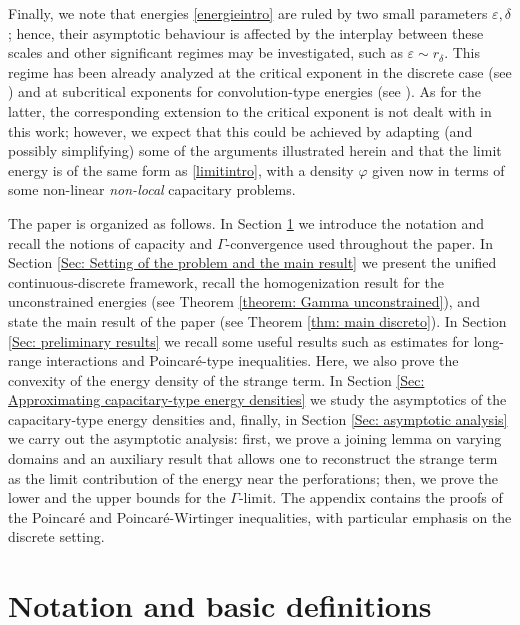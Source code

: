 \documentclass{article}
\theoremstyle{plain}
\theoremstyle{definition}
\def\e{\varepsilon}
\newcommand{\f}{\varphi}
\numberwithin{equation}{section}
\begin{document}
   \smallskip
   
Finally, we note that energies \eqref{energieintro} are ruled by two small parameters $\e,\delta$; hence, their asymptotic behaviour is affected by the interplay between these scales and other significant regimes may be investigated, such as $\e\sim r_\delta$. This regime has been already analyzed at the critical exponent in the discrete case (see \cite{Sig-dis}) and at subcritical exponents for convolution-type energies (see \cite{AGL}). As for the latter, the corresponding extension to the critical exponent is not dealt with in this work; however, we expect that this could be achieved by adapting (and possibly simplifying) some of the arguments illustrated herein and that the limit energy is of the same form as \eqref{limitintro}, with a density $\f$ given now in terms of some non-linear \textit{non-local} capacitary problems.

\smallskip

The paper is organized as follows. In Section \ref{Sec: notation} we introduce the notation and recall the notions of capacity and $\Gamma$-convergence used throughout the paper. In Section \ref{Sec: Setting of the problem and the main result} we present the unified continuous-discrete framework, recall the homogenization result for the unconstrained energies (see Theorem \ref{theorem: Gamma unconstrained}), and state the main result of the paper (see Theorem \ref{thm: main discreto}). In Section \ref{Sec: preliminary results} we recall some useful results such as estimates for long-range interactions and Poincaré-type inequalities. Here, we also prove the convexity of the energy density of the strange term. In Section \ref{Sec: Approximating capacitary-type energy densities} we study the asymptotics of the capacitary-type energy densities and, finally, in Section \ref{Sec: asymptotic analysis} we carry out the asymptotic analysis: first, we prove a joining lemma on varying domains and an auxiliary result that allows one to reconstruct the strange term as the limit contribution of the energy near the perforations; then, we prove the lower and the upper bounds for the $\Gamma$-limit. The appendix contains the proofs of the Poincaré and Poincaré-Wirtinger inequalities, with particular emphasis on the discrete setting.

\section{Notation and basic definitions}
\label{Sec: notation}
\end{document}
